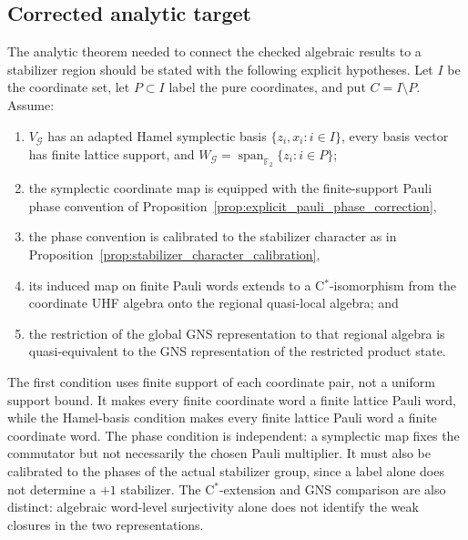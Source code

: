 \documentclass{article}
\begin{document}
\subsection*{Corrected analytic target}

The analytic theorem needed to connect the checked algebraic results to a
stabilizer region should be stated with the following explicit hypotheses.
Let \(I\) be the coordinate set, let \(P\subset I\) label the pure
coordinates, and put \(C=I\setminus P\).  Assume:
\begin{enumerate}
\item \(V_{\mathcal G}\) has an adapted Hamel symplectic basis
\(\{z_i,x_i:i\in I\}\), every basis vector has finite lattice support, and
\(W_{\mathcal G}=\operatorname{span}_{\mathbb F_2}\{z_i:i\in P\}\);
\item the symplectic coordinate map is equipped with the finite-support
Pauli phase convention of Proposition~\ref{prop:explicit_pauli_phase_correction},
\item the phase convention is calibrated to the stabilizer character as in
Proposition~\ref{prop:stabilizer_character_calibration},
\item its induced map on finite Pauli words extends to a C\(^*\)-isomorphism
from the coordinate UHF algebra onto the regional quasi-local algebra; and
\item the restriction of the global GNS representation to that regional
algebra is quasi-equivalent to the GNS representation of the restricted
product state.
\end{enumerate}
The first condition uses finite support of each coordinate pair, not a
uniform support bound.  It makes every finite coordinate word a finite lattice
Pauli word, while the Hamel-basis condition makes every finite lattice Pauli
word a finite coordinate word.  The phase condition is independent: a
symplectic map fixes the commutator but not necessarily the chosen Pauli
multiplier.  It must also be calibrated to the phases of the actual
stabilizer group, since a label alone does not determine a $+1$ stabilizer.
The C\(^*\)-extension and GNS comparison are also distinct:
algebraic word-level surjectivity alone does not identify the weak closures in
the two representations.
\end{document}
